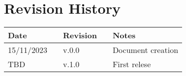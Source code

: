 \chapter*{Revision History}

\begin{table}[h]
    \centering
    \begin{tabular}{l p{2.5cm} l p{2.5cm} l}
        \hline
        \textbf{Date} &  & \textbf{Revision} &  & \textbf{Notes}    \\ \hline
        15/11/2023    &  & v.0.0             &  & Document creation \\
        TBD           &  & v.1.0             &  & First relese      \\ \hline
    \end{tabular}
\end{table}

\newpage